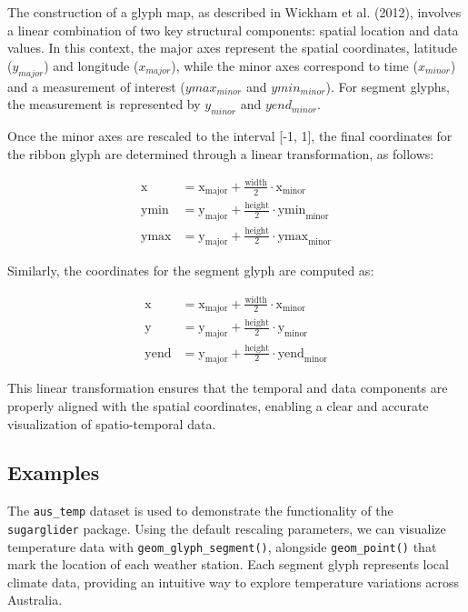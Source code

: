 The construction of a glyph map, as described in Wickham et al. (2012), involves a linear combination of two key structural components: spatial location and data values. In this context, the major axes represent the spatial coordinates, latitude (\(y_{major}\)) and longitude (\(x_{major}\)), while the minor axes correspond to time (\(x_{minor}\)) and a measurement of interest (\(ymax_{minor}\) and \(ymin_{minor}\)). For segment glyphs, the measurement is represented by \(y_{minor}\) and \(yend_{minor}\).

Once the minor axes are rescaled to the interval {[}-1, 1{]}, the final coordinates for the ribbon glyph are determined through a linear transformation, as follows:

\begin{align}
\text{x} &= \text{x}_{\text{major}} + \frac{\text{width}}{2} \cdot \text{x}_{\text{minor}} \\
\text{ymin} &= \text{y}_{\text{major}} + \frac{\text{height}}{2} \cdot \text{ymin}_{\text{minor}} \\
\text{ymax} &= \text{y}_{\text{major}} + \frac{\text{height}}{2} \cdot \text{ymax}_{\text{minor}}

\end{align}

Similarly, the coordinates for the segment glyph are computed as:

\begin{align}
\text{x} &= \text{x}_{\text{major}} + \frac{\text{width}}{2} \cdot \text{x}_{\text{minor}} \\
\text{y} &= \text{y}_{\text{major}} + \frac{\text{height}}{2} \cdot \text{y}_{\text{minor}} \\
\text{yend} &= \text{y}_{\text{major}} + \frac{\text{height}}{2} \cdot \text{yend}_{\text{minor}}

\end{align}

This linear transformation ensures that the temporal and data components are properly aligned with the spatial coordinates, enabling a clear and accurate visualization of spatio-temporal data.

\subsection{Examples}\label{examples}

The \texttt{aus\_temp} dataset is used to demonstrate the functionality of the \texttt{sugarglider} package. Using the default rescaling parameters, we can visualize temperature data with \texttt{geom\_glyph\_segment()}, alongside \texttt{geom\_point()} that mark the location of each weather station. Each segment glyph represents local climate data, providing an intuitive way to explore temperature variations across Australia.

